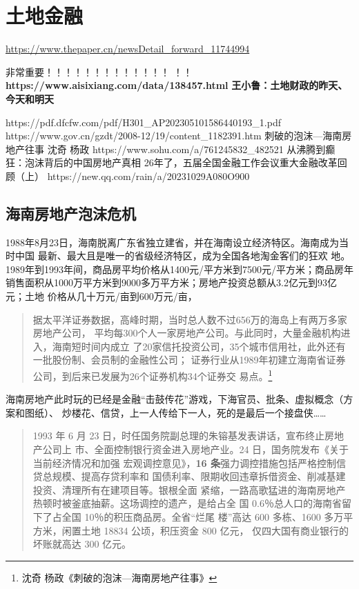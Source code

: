 \section{土地金融}
\url{https://www.thepaper.cn/newsDetail_forward_11744994}


非常重要！！！！！！！！！！！！！
！！\textbf{https://www.aisixiang.com/data/138457.html}
\textbf{王小鲁：土地财政的昨天、今天和明天}

https://pdf.dfcfw.com/pdf/H301_AP202305101586440193_1.pdf
https://www.gov.cn/gzdt/2008-12/19/content_1182391.htm
刺破的泡沫—海南房地产往事  沈奇 杨政 https://www.sohu.com/a/761245832_482521
从沸腾到癫狂：泡沫背后的中国房地产真相
26年了，五届全国金融工作会议重大金融改革回顾（上）
https://new.qq.com/rain/a/20231029A080O900

\subsection{海南房地产泡沫危机}
\label{sec:hainan}

1988年8月23日，海南脱离广东省独立建省，并在海南设立经济特区。海南成为当时中国
最新、最大且是唯一的省级经济特区，成为全国各地淘金客们的狂欢
地。1989年到1993年间，商品房平均价格从1400元/平方米到7500元/平方米；商品房年
销售面积从1000万平方米到9000多万平方米；房地产投资总额从3.2亿元到93亿元；土地
价格从几十万元/亩到600万元/亩，


\begin{quotation}
  据太平洋证券数据，高峰时期，当时总人数不过656万的海岛上有两万多家房地产公司，
  平均每300个人一家房地产公司。与此同时，大量金融机构进入，海南短时间内成立
  了20家信托投资公司，35个城市信用社，此外还有一批股份制、会员制的金融性公司；
  证券行业从1989年初建立海南省证券公司，到后来已发展为26个证券机构34个证券交
  易点。\footnote{沈奇 杨政《刺破的泡沫—海南房地产往事》}
\end{quotation}
海南房地产此时玩的已经是金融“击鼓传花”游戏，下海官员、批条、虚拟概念（方案和图纸）、
炒楼花、信贷，上一人传给下一人，死的是最后一个接盘侠……

\begin{quotation}
  1993 年 6 月 23 日，时任国务院副总理的朱镕基发表讲话，宣布终止房地产公司上
  市、全面控制银行资金进入房地产业。24 日，国务院发布《关于当前经济情况和加强
  宏观调控意见》，\textbf{16 条}强力调控措施包括严格控制信贷总规模、提高存贷利率和
  国债利率、限期收回违章拆借资金、削减基建投资、清理所有在建项目等。银根全面
  紧缩，一路高歌猛进的海南房地产热顿时被釜底抽薪。这场调控的遗产，是给占全
  国 0.6％总人口的海南省留下了占全国 10％的积压商品房。全省“烂尾
  楼”高达 600 多栋、1600 多万平方米，闲置土地 18834 公顷，积压资金 800 亿元，
  仅四大国有商业银行的坏账就高达 300 亿元。
\end{quotation}

